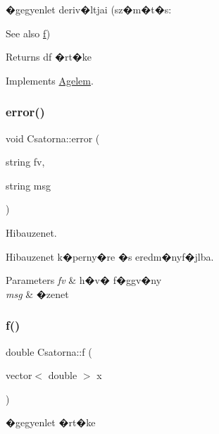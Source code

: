 �gegyenlet deriv�ltjai (sz�m�t�s\+:

\begin{DoxySeeAlso}{See also}
\hyperlink{class_csatorna_a5cd4e0975717ce0baab89f57a566782a}{f}) 
\end{DoxySeeAlso}
\begin{DoxyReturn}{Returns}
df �rt�ke 
\end{DoxyReturn}


Implements \hyperlink{class_agelem_a7934ea6320bdc37526ed3daa108ce1ed}{Agelem}.

\mbox{\label{class_csatorna_a765dd9b66d2a18b567a6045d17266a10}} 
\subsubsection{\texorpdfstring{error()}{error()}}
{\footnotesize\ttfamily void Csatorna\+::error (\begin{DoxyParamCaption}\item[{string}]{fv,  }\item[{string}]{msg }\end{DoxyParamCaption})}



Hibauzenet. 

Hibauzenet k�perny�re �s eredm�nyf�jlba.


\begin{DoxyParams}{Parameters}
{\em fv} & h�v� f�ggv�ny \\
\hline
{\em msg} & �zenet \\
\hline
\end{DoxyParams}
\mbox{\label{class_csatorna_a5cd4e0975717ce0baab89f57a566782a}} 
\subsubsection{\texorpdfstring{f()}{f()}}
{\footnotesize\ttfamily double Csatorna\+::f (\begin{DoxyParamCaption}\item[{vector$<$ double $>$}]{x }\end{DoxyParamCaption})\hspace{0.3cm}{\ttfamily [virtual]}}



�gegyenlet �rt�ke 

